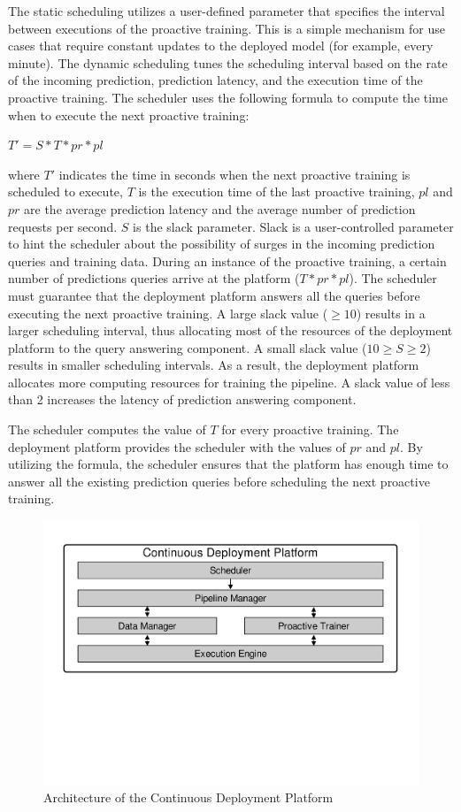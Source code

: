 The static scheduling utilizes a user-defined parameter that specifies the interval between executions of the proactive training.
This is a simple mechanism for use cases that require constant updates to the deployed model (for example, every minute).
The dynamic scheduling tunes the scheduling interval based on the rate of the incoming prediction, prediction latency, and the execution time of the proactive training.
The scheduler uses the following formula to compute the time when to execute the next proactive training:
\begin{center}
$T' = S * T * pr * pl$
\end{center}
where $T'$ indicates the time in seconds when the next proactive training is scheduled to execute, $T$ is the execution time of the last proactive training, $pl$ and $pr$ are the average prediction latency and the average number of prediction requests per second.
$S$ is the slack parameter.
Slack is a user-controlled parameter to hint the scheduler about the possibility of surges in the incoming prediction queries and training data.
During an instance of the proactive training, a certain number of predictions queries arrive at the platform ($T * pr * pl$).
The scheduler must guarantee that the deployment platform answers all the queries before executing the next proactive training.
A large slack value ($\geq10$) results in a larger scheduling interval, thus allocating most of the resources of the deployment platform to the query answering component.
A small slack value ($10 \geq S \geq 2$) results in smaller scheduling intervals.
As a result, the deployment platform allocates more computing resources for training the pipeline.
A slack value of less than 2 increases the latency of prediction answering component.

The scheduler computes the value of $T$ for every proactive training.
The deployment platform provides the scheduler with the values of $pr$ and $pl$. 
By utilizing the formula, the scheduler ensures that the platform has enough time to answer all the existing prediction queries before scheduling the next proactive training.
\begin{figure}[h]
\centering
\includegraphics[width=\columnwidth]{../images/system-architecture.pdf}
\caption{Architecture of the Continuous Deployment Platform}
\label{fig:system-architecture}
\end{figure}


